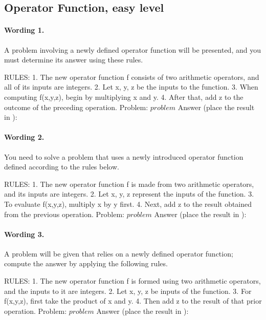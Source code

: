 \subsection*{Operator Function, easy level}

\paragraph{Wording 1.}
\begin{promptbox}
A problem involving a newly defined operator function will be presented, and you must determine its answer using these rules.

RULES:
1. The new operator function f consists of two arithmetic operators, and all of its inputs are integers.
2. Let x, y, z be the inputs to the function.
3. When computing f(x,y,z), begin by multiplying x and y.
4. After that, add z to the outcome of the preceding operation.
Problem: \({problem}\)
Answer (place the result in \boxed{}):\boxed{}
\end{promptbox}

\paragraph{Wording 2.}
\begin{promptbox}
You need to solve a problem that uses a newly introduced operator function defined according to the rules below.

RULES:
1. The new operator function f is made from two arithmetic operators, and its inputs are integers.
2. Let x, y, z represent the inputs of the function.
3. To evaluate f(x,y,z), multiply x by y first.
4. Next, add z to the result obtained from the previous operation.
Problem: \({problem}\)
Answer (place the result in \boxed{}):\boxed{}
\end{promptbox}

\paragraph{Wording 3.}
\begin{promptbox}
A problem will be given that relies on a newly defined operator function; compute the answer by applying the following rules.

RULES:
1. The new operator function f is formed using two arithmetic operators, and the inputs to it are integers.
2. Let x, y, z be inputs of the function.
3. For f(x,y,z), first take the product of x and y.
4. Then add z to the result of that prior operation.
Problem: \({problem}\)
Answer (place the result in \boxed{}):\boxed{}
\end{promptbox}

